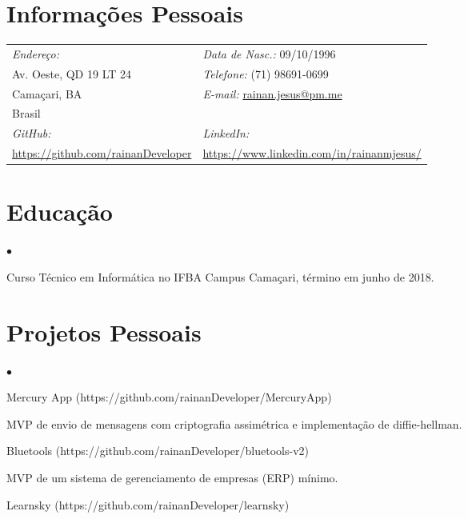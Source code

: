 \documentclass[margin,line]{res}
\newenvironment{list2}{
 \begin{list}{$\bullet$}{%
     \setlength{\itemsep}{0in}
     \setlength{\parsep}{0in} \setlength{\parskip}{0in}
     \setlength{\topsep}{0in} \setlength{\partopsep}{0in}
     \setlength{\leftmargin}{0.2in}}}{\end{list}}
\begin{document}
\vspace{0.2cm}
\begin{resume}
\section{Informações Pessoais}
\vspace{.05in}
\begin{tabular}{@{}p{2.5in}p{3.5in}}
{\it Endereço: }                   & {\it Data de Nasc.:}  09/10/1996 \\
Av. Oeste, QD 19 LT 24 & {\it Telefone:}  (71) 98691-0699 \\
Camaçari, BA            & {\it E-mail:}  \href{mailto:rainan.jesus@pm.me}{rainan.jesus@pm.me}\\
Brasil                      & {\it }\\
{\it GitHub:}  & {\it LinkedIn:} \\
\href{https://github.com/rainanDeveloper}{https://github.com/rainanDeveloper} & \href{https://www.linkedin.com/in/rainanmjesus/}{https://www.linkedin.com/in/rainanmjesus/}
\end{tabular}
\vspace{0.2cm}
\section{Educação}
\begin{list2}

\item Curso Técnico em Informática no IFBA Campus Camaçari, término em junho de 2018.
\end{list2}
\section{Projetos Pessoais}
\begin{list2}
\item Mercury App (https://github.com/rainanDeveloper/MercuryApp)

    MVP de envio de mensagens com criptografia assimétrica e implementação de diffie-hellman.
\item Bluetools (https://github.com/rainanDeveloper/bluetools-v2)

    MVP de um sistema de gerenciamento de empresas (ERP) mínimo.
\item Learnsky (https://github.com/rainanDeveloper/learnsky)


\end{list2}
\end{resume}
\end{document}
